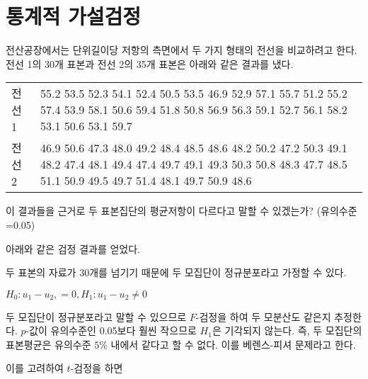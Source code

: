 \section{통계적 가설검정}
전산공장에서는 단위길이당 저항의 측면에서 두 가지 형태의 전선을 비교하려고
한다. 전선 1의 30개 표본과 전선 2의 35개 표본은 아래와 같은 결과를 냈다.

\begin{tabularx}{0.9\textwidth}{ l|X }
  \noalign{\smallskip}\hline\noalign{\smallskip}
  전선 1 & 
    55.2 53.5 52.3 54.1 52.4 50.5 53.5 46.9 52.9 57.1
    55.7 51.2 55.2 57.4 53.9 58.1 50.6 59.4 51.8 50.8
    56.9 56.3 59.1 52.7 56.1 58.2 53.1 50.6 53.1 59.7 \\
  전선 2 &
    46.9 50.6 47.3 48.0 49.2 48.4 48.5 48.6 48.2 50.2
    47.2 50.3 49.1 48.2 47.4 48.1 49.4 47.4 49.7 49.1
    49.3 50.3 50.8 48.3 47.7 48.5 51.1 50.9 49.5 49.7
    51.4 48.1 49.7 50.9 48.6
\end{tabularx}

이 결과들을 근거로 두 표본집단의 평균저항이 다르다고 말할 수 있겠는가?
{\small(유의수준=0.05)}

아래와 같은 검정 결과를 얻었다.


두 표본의 자료가 30개를 넘기기 때문에 두 모집단이 정규분포라고 가정할 수 있다.

$H_0: u_1 - u_2, = 0, H_1: u_1 - u_2 \not= 0$

두 모집단이 정규분포라고 말할 수 있으므로 $F$-검정을 하여 두 모분산도 같은지 추정한다.
$p$-값이 유의수준인 0.05보다 훨씬 작으므로 $H_1$은 기각되지 않는다.
즉, 두 모집단의 표본평균은 유의수준 $5\%$ 내에서 같다고 할 수 없다.
이를 베렌스-피셔 문제라고 한다.

이를 고려하여 $t$-검정을 하면
